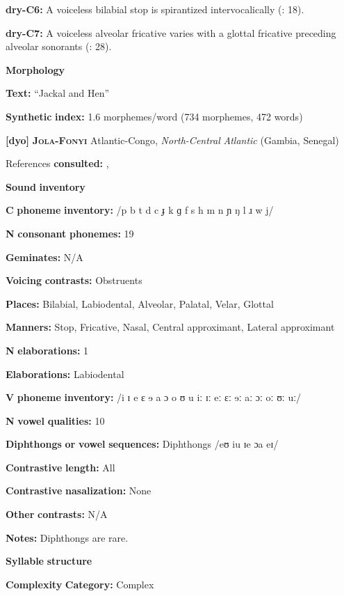 \begin{styleBody}
\textbf{dry-C6:} A voiceless bilabial stop is spirantized intervocalically (\citealt{KotapishKotapish1973}: 18).

\textbf{dry-C7:} A voiceless alveolar fricative varies with a glottal fricative preceding alveolar sonorants (\citealt{KotapishKotapish1973}: 28).

\textbf{Morphology}

\textbf{Text:} “Jackal and Hen” \citep[180-192]{Dhakal2012}

\textbf{Synthetic} \textbf{index:} 1.6 morphemes/word (734 morphemes, 472 words)

\textbf{[dyo]}   \textbf{\textsc{Jola-Fonyi}}  Atlantic-Congo, \textit{North-Central} \textit{Atlantic} (Gambia, Senegal)

References \textbf{consulted:} \citet{Lavergne1979}, \citet{Sapir1965}

\textbf{Sound} \textbf{inventory}

\textbf{C} \textbf{phoneme} \textbf{inventory:} /p b t d c ɟ k ɡ f s h m n ɲ ŋ l ɹ w j/

\textbf{N} \textbf{consonant} \textbf{phonemes:} 19

\textbf{Geminates:} N/A

\textbf{Voicing} \textbf{contrasts:} Obstruents

\textbf{Places:} Bilabial, Labiodental, Alveolar, Palatal, Velar, Glottal

\textbf{Manners:} Stop, Fricative, Nasal, Central approximant, Lateral approximant

\textbf{N} \textbf{elaborations:} 1

\textbf{Elaborations:} Labiodental

\textbf{V} \textbf{phoneme} \textbf{inventory:} /i ɪ e ɛ ɘ a ɔ o ʊ u iː ɪː eː ɛː ɘː aː ɔː oː ʊː uː/

\textbf{N} \textbf{vowel} \textbf{qualities:} 10

\textbf{Diphthongs} \textbf{or} \textbf{vowel} \textbf{sequences:} Diphthongs /eʊ iu ɪe ɔa eɪ/

\textbf{Contrastive} \textbf{length:} All

\textbf{Contrastive} \textbf{nasalization:} None

\textbf{Other} \textbf{contrasts:} N/A

\textbf{Notes:} Diphthongs are rare.

\textbf{Syllable} \textbf{structure}

\textbf{Complexity} \textbf{Category:} Complex


\end{styleBody}
